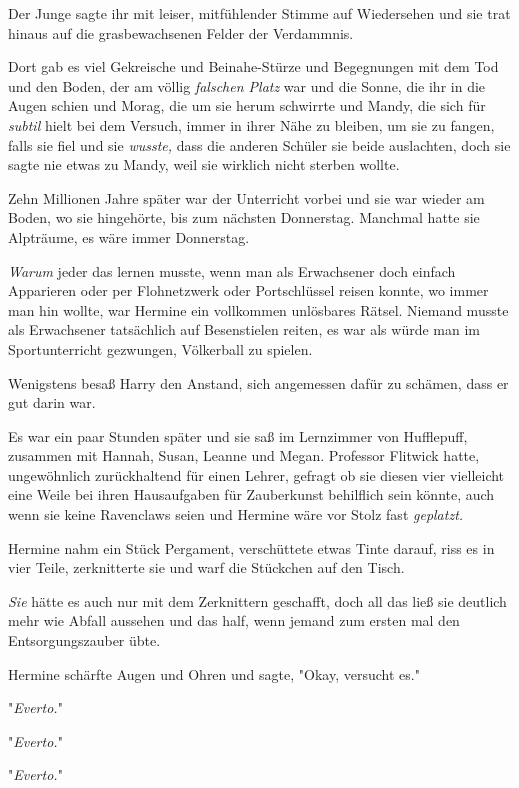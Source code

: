 {Der Junge sagte ihr mit leiser, mitfühlender Stimme auf Wiedersehen und sie trat hinaus auf die grasbewachsenen Felder der Verdammnis.

Dort gab es viel Gekreische und Beinahe-Stürze und Begegnungen mit dem Tod und den Boden, der am völlig \emph{falschen Platz} war und die Sonne, die ihr in die Augen schien und Morag, die um sie herum schwirrte und Mandy, die sich für \emph{subtil} hielt bei dem Versuch, immer in ihrer Nähe zu bleiben, um sie zu fangen, falls sie fiel und sie \emph{wusste,} dass die anderen Schüler sie beide auslachten, doch sie sagte nie etwas zu Mandy, weil sie wirklich nicht sterben wollte.

Zehn Millionen Jahre später war der Unterricht vorbei und sie war wieder am Boden, wo sie hingehörte, bis zum nächsten Donnerstag. Manchmal hatte sie Alpträume, es wäre immer Donnerstag.

\emph{Warum} jeder das lernen musste, wenn man als Erwachsener doch einfach Apparieren oder per Flohnetzwerk oder Portschlüssel reisen konnte, wo immer man hin wollte, war Hermine ein vollkommen unlösbares Rätsel. Niemand musste als Erwachsener tatsächlich auf Besenstielen reiten, es war als würde man im Sportunterricht gezwungen, Völkerball zu spielen.

Wenigstens besaß Harry den Anstand, sich angemessen dafür zu schämen, dass er gut darin war.

\later

Es war ein paar Stunden später und sie saß im Lernzimmer von Hufflepuff, zusammen mit Hannah, Susan, Leanne und Megan. Professor Flitwick hatte, ungewöhnlich zurückhaltend für einen Lehrer, gefragt ob sie diesen vier vielleicht eine Weile bei ihren Hausaufgaben für Zauberkunst behilflich sein könnte, auch wenn sie keine Ravenclaws seien und Hermine wäre vor Stolz fast \emph{geplatzt.}

Hermine nahm ein Stück Pergament, verschüttete etwas Tinte darauf, riss es in vier Teile, zerknitterte sie und warf die Stückchen auf den Tisch.

\emph{Sie} hätte es auch nur mit dem Zerknittern geschafft, doch all das ließ sie deutlich mehr wie Abfall aussehen und das half, wenn jemand zum ersten mal den Entsorgungszauber übte.

Hermine schärfte Augen und Ohren und sagte, "Okay, versucht es."

"\emph{Everto.}"

"\emph{Everto.}"

"\emph{Everto.}"

}
